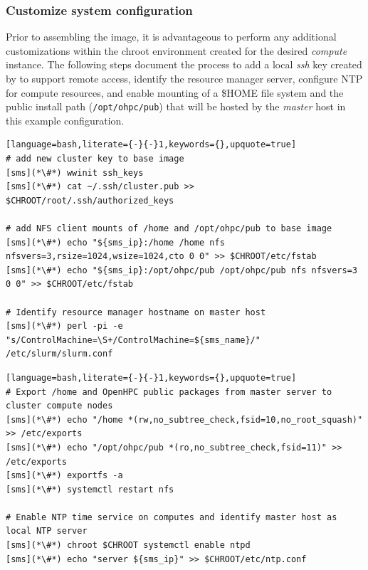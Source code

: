 \documentclass[letterpaper]{article}
\begin{document}
\subsubsection{Customize system configuration} \label{sec:master_customization}

Prior to assembling the image, it is advantageous to perform any additional
customizations within the chroot environment created for the desired {\em
 compute} instance. The following steps document the process to add a local
{\em ssh} key created by \Warewulf{} to support remote access, identify the
resource manager server, configure NTP for compute resources, and enable \NFS{}
mounting of a \$HOME file system and the public \OHPC{} install path
(\texttt{/opt/ohpc/pub}) that will be hosted by the {\em master} host in this
example configuration.

\begin{lstlisting}[language=bash,literate={-}{-}1,keywords={},upquote=true]
# add new cluster key to base image
[sms](*\#*) wwinit ssh_keys
[sms](*\#*) cat ~/.ssh/cluster.pub >> $CHROOT/root/.ssh/authorized_keys

# add NFS client mounts of /home and /opt/ohpc/pub to base image
[sms](*\#*) echo "${sms_ip}:/home /home nfs nfsvers=3,rsize=1024,wsize=1024,cto 0 0" >> $CHROOT/etc/fstab
[sms](*\#*) echo "${sms_ip}:/opt/ohpc/pub /opt/ohpc/pub nfs nfsvers=3 0 0" >> $CHROOT/etc/fstab

# Identify resource manager hostname on master host
[sms](*\#*) perl -pi -e "s/ControlMachine=\S+/ControlMachine=${sms_name}/" /etc/slurm/slurm.conf
\end{lstlisting}

\clearpage
\begin{lstlisting}[language=bash,literate={-}{-}1,keywords={},upquote=true]
# Export /home and OpenHPC public packages from master server to cluster compute nodes
[sms](*\#*) echo "/home *(rw,no_subtree_check,fsid=10,no_root_squash)" >> /etc/exports
[sms](*\#*) echo "/opt/ohpc/pub *(ro,no_subtree_check,fsid=11)" >> /etc/exports
[sms](*\#*) exportfs -a
[sms](*\#*) systemctl restart nfs

# Enable NTP time service on computes and identify master host as local NTP server
[sms](*\#*) chroot $CHROOT systemctl enable ntpd
[sms](*\#*) echo "server ${sms_ip}" >> $CHROOT/etc/ntp.conf
\end{lstlisting}
\end{document}

